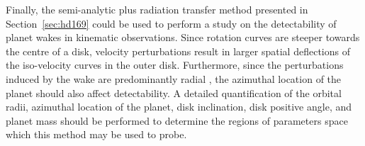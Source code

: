 Finally, the semi-analytic plus radiation transfer method presented in Section~\ref{sec:hd169} could be used to perform a study on the detectability of planet wakes in kinematic observations.
Since rotation curves are steeper towards the centre of a disk, velocity perturbations result in larger spatial deflections of the iso-velocity curves in the outer disk.
Furthermore, since the perturbations induced by the wake are predominantly radial \citep{rafikov2002a,calcino2022}, the azimuthal location of the planet should also affect detectability.
A detailed quantification of the orbital radii, azimuthal location of the planet, disk inclination, disk positive angle, and planet mass should be performed to determine the regions of parameters space which this method may be used to probe.